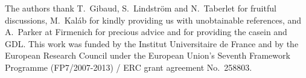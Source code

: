 \documentclass[twocolumn,superscriptaddress,showpacs,preprintnumbers,amsmath,amssymb,prl]{revtex4}
\begin{document}



\begin{acknowledgments}
The authors thank T.~Gibaud, S.~Lindstr\"om and N.~Taberlet for fruitful discussions, M.~Kal\'ab for kindly providing us with unobtainable references, and A.~Parker at Firmenich for precious advice and for providing the casein and GDL. This work was funded by the Institut Universitaire de France and by the European Research Council under the European Union's Seventh Framework Programme (FP7/2007-2013) / ERC grant agreement No.~258803. 
\end{acknowledgments}
\end{document}
